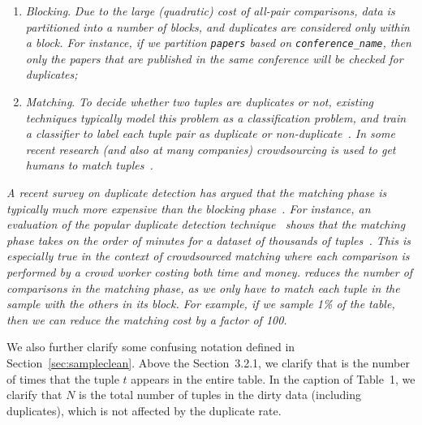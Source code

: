 \begin{enumerate}\vspace{-.25em}
\item \emph{Blocking}. 
\textit{Due to the large (quadratic) cost of all-pair comparisons, data is partitioned into a number of blocks, and duplicates are considered only within a block. 
For instance, if we partition \texttt{papers} based on \texttt{conference\_name}, then only the papers that are published in the same conference will be checked for duplicates; \vspace{-.25em}}
\vspace{-.25em}
\item \emph{Matching}. 
\textit{To decide whether two tuples are duplicates or not, existing techniques typically model this problem as a classification problem, and train a classifier to label each tuple pair as duplicate or non-duplicate~\cite{DBLP:conf/kdd/BilenkoM03}. 
In some recent research (and also at many companies) crowdsourcing is used to get humans to match tuples~\cite{DBLP:journals/pvldb/WangKFF12,DBLP:conf/www/DemartiniDC12}.}
\end{enumerate}\vspace{-.25em}

\textit{A recent survey on duplicate detection has argued that the matching phase is typically much more expensive than the blocking phase~\cite{journals/tkde/Christen11}. 
For instance, an evaluation of the popular duplicate detection technique~\cite{DBLP:conf/kdd/BilenkoM03} shows that the matching phase takes on the order of minutes for a dataset of thousands of tuples~\cite{journals/pvldb/KopckeTR10}.
This is especially true in the context of crowdsourced matching where each comparison is performed by a crowd worker costing both time and money.
\saqpplus reduces the number of comparisons in the matching phase, as we only have to match each tuple in the sample with the others in its block.
For example, if we sample 1\% of the table, then we can reduce the matching cost by a factor of 100.}
\newline

We also further clarify some confusing notation defined in Section~\ref{sec:sampleclean}. Above the Section~3.2.1, we clarify that  is the number of times that the tuple $t$ appears in the entire table. In the caption of Table~1, we clarify  that $N$ is the total number of tuples in the dirty data (including duplicates), which is not affected by the duplicate rate.  

